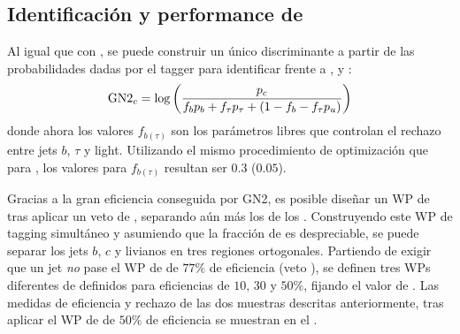 \subsection{Identificaci\'on y performance de \ctagging}

Al igual que con \btagging, se puede construir un único discriminante a partir de las probabilidades dadas por el tagger para identificar \cjets frente a \bjets, \tjets y \ljets:
\begin{equation}
    \text{GN2}_{c} = \log \left(
        \frac{p_c}{f_b p_b + f_{\tau} p_{\tau} + \left(1-f_b-f_{\tau}p_u\right)}
    \right)
\end{equation}
donde ahora los valores \(f_{b(\tau)}\) son los parámetros libres que controlan el rechazo entre jets \(b\), \(\tau\) y light. Utilizando el mismo procedimiento de optimización que para \btagging, los valores para \(f_{b(\tau)}\) resultan ser \(0.3\) (\(0.05\)).

Gracias a la gran eficiencia \btagging conseguida por GN2, es posible diseñar un \ac{WP} de \ctagging tras aplicar un veto de \btagging, separando aún más los \cjets de los \ljets. Construyendo este \ac{WP} de tagging simultáneo y asumiendo que la fracción de \tjets es despreciable, se puede separar los jets \(b\), \(c\) y livianos en tres regiones ortogonales. Partiendo de exigir que un jet \textit{no} pase el \ac{WP} de \btagging de \(77\%\) de eficiencia (veto \btag), se definen tres \acp{WP} diferentes de \ctagging definidos para eficiencias de \(10, \, 30\) y \(50\%\), fijando el valor de \gntc. Las medidas de eficiencia y rechazo de las dos muestras descritas anteriormente, tras aplicar el \ac{WP} de \ctag de \(50\%\) de eficiencia se muestran en el \Tab{\ref{tab:objects:ftag:ctag_efficiency_original}}.

\begin{table}[ht!]
    \caption{Medidas de eficiencia de \ctagging efficiencies para \cjets, y valores de rechazos de \bjets, \ljets y \tjets en los regímenesde bajo y alto \pt. Los valores corresponden a aquellos luego de aplicar el veto del \ac{WP} de \btagging de \(77\%\) y de \(50\%\)  de \ctagging. }
    \label{tab:objects:ftag:ctag_efficiency_original}
\end{table}
